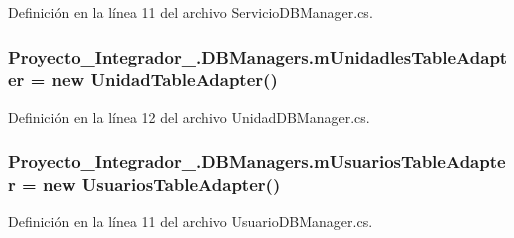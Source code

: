 Definición en la línea 11 del archivo Servicio\-D\-B\-Manager.\-cs.

\hypertarget{class_proyecto___integrador__3_1_1_d_b_managers_a5d36d244f440437683f2b0cd30720ac5}{
\subsubsection[{m\-Unidadles\-Table\-Adapter}]{ Proyecto\-\_\-\-Integrador\-\_.\-D\-B\-Managers.\-m\-Unidadles\-Table\-Adapter = new {\bf Unidad\-Table\-Adapter}()\hspace{0.3cm}{\ttfamily [protected]}}}\label{class_proyecto___integrador__3_1_1_d_b_managers_a5d36d244f440437683f2b0cd30720ac5}


Definición en la línea 12 del archivo Unidad\-D\-B\-Manager.\-cs.

\hypertarget{class_proyecto___integrador__3_1_1_d_b_managers_a8830e1bb507bcd7277966a4aabe3e830}{
\subsubsection[{m\-Usuarios\-Table\-Adapter}]{ Proyecto\-\_\-\-Integrador\-\_.\-D\-B\-Managers.\-m\-Usuarios\-Table\-Adapter = new {\bf Usuarios\-Table\-Adapter}()\hspace{0.3cm}{\ttfamily [protected]}}}\label{class_proyecto___integrador__3_1_1_d_b_managers_a8830e1bb507bcd7277966a4aabe3e830}


Definición en la línea 11 del archivo Usuario\-D\-B\-Manager.\-cs.



